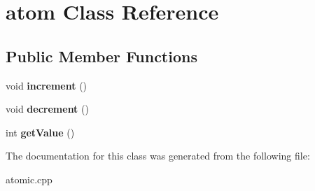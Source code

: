\hypertarget{classatom}{}\section{atom Class Reference}
\label{classatom}
\subsection*{Public Member Functions}
\begin{DoxyCompactItemize}
\item 
void {\bfseries increment} ()\hypertarget{classatom_aeb0645aa068302287de6f05afe02bb72}{}\label{classatom_aeb0645aa068302287de6f05afe02bb72}

\item 
void {\bfseries decrement} ()\hypertarget{classatom_aaf37ef7d2bcf271f03a00c3d08a1de52}{}\label{classatom_aaf37ef7d2bcf271f03a00c3d08a1de52}

\item 
int {\bfseries get\+Value} ()\hypertarget{classatom_aa90138be7dd1bd0dbfcdd76f21232138}{}\label{classatom_aa90138be7dd1bd0dbfcdd76f21232138}

\end{DoxyCompactItemize}


The documentation for this class was generated from the following file\+:\begin{DoxyCompactItemize}
\item 
atomic.\+cpp\end{DoxyCompactItemize}
